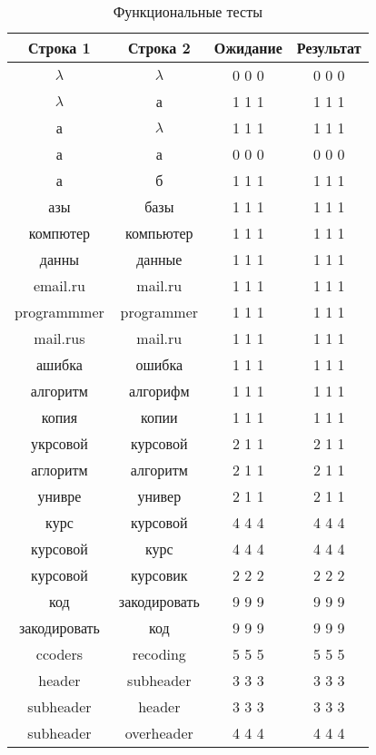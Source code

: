 \documentclass[12pt, a4paper]{report}
\begin{document}
	\begin{table}[ht!]
		\caption{Функциональные тесты}
		\begin{center}
			\begin{tabular}{|c|c|c|c|}
			\hline
			\bf{Строка 1} & \bf{Строка 2} & \bf{Ожидание} & \bf{Результат}\\\hline
			$\lambda$ & $\lambda$ & 0 0 0 & 0 0 0\\\hline
			$\lambda$ & а & 1 1 1 & 1 1 1\\\hline
			а & $\lambda$ & 1 1 1 & 1 1 1\\\hline
			а & а & 0 0 0 & 0 0 0\\\hline
			а & б & 1 1 1 & 1 1 1\\\hline
			азы & базы & 1 1 1 & 1 1 1\\\hline
			компютер & компьютер & 1 1 1 & 1 1 1\\\hline
			данны & данные & 1 1 1 & 1 1 1\\\hline
			email.ru & mail.ru & 1 1 1 & 1 1 1\\\hline
			programmmer & programmer & 1 1 1 & 1 1 1\\\hline
			mail.rus & mail.ru & 1 1 1 & 1 1 1\\\hline
			ашибка & ошибка & 1 1 1 & 1 1 1\\\hline
			алгоритм & алгорифм & 1 1 1 & 1 1 1\\\hline
			копия & копии & 1 1 1 & 1 1 1\\\hline
			укрсовой & курсовой & 2 1 1 & 2 1 1\\\hline
			аглоритм & алгоритм & 2 1 1 & 2 1 1\\\hline
			унивре & универ & 2 1 1 & 2 1 1\\\hline
			курс & курсовой & 4 4 4 & 4 4 4\\\hline
			курсовой & курс & 4 4 4 & 4 4 4\\\hline
			курсовой & курсовик & 2 2 2 & 2 2 2\\\hline
			код & закодировать & 9 9 9 & 9 9 9\\\hline
			закодировать & код & 9 9 9 & 9 9 9\\\hline
			ccoders & recoding & 5 5 5 & 5 5 5\\\hline
			header & subheader & 3 3 3 & 3 3 3\\\hline
			subheader & header & 3 3 3 & 3 3 3\\\hline
			subheader & overheader & 4 4 4 & 4 4 4\\\hline
			\end{tabular}
		\end{center}
	\end{table}
\end{document}
